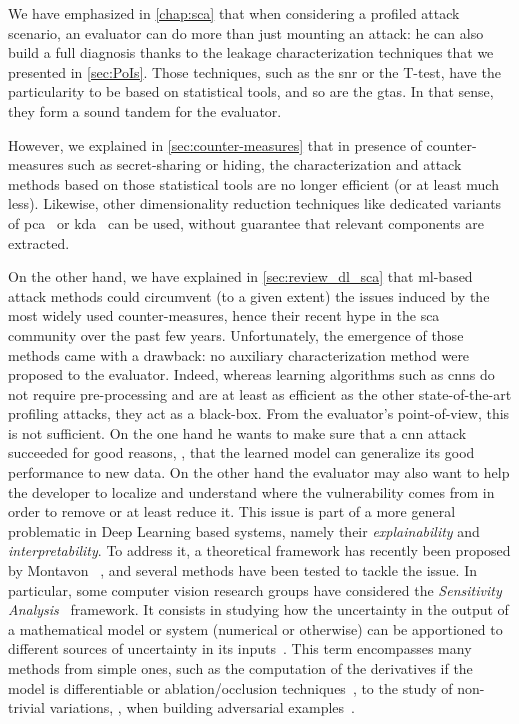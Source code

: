 We have emphasized in \autoref{chap:sca} that when considering a profiled attack scenario, an evaluator can do more than just mounting an attack: he can also build a full diagnosis thanks to the leakage characterization techniques that we presented in \autoref{sec:PoIs}.
Those techniques, such as the \gls{snr} or the T-test, have the particularity to be based on statistical tools, and so are the \glspl{gta}.
In that sense, they form a sound tandem for the evaluator.

However, we explained in \autoref{sec:counter-measures} that in presence of counter-measures such as secret-sharing or hiding, the characterization and attack methods based on those statistical tools are no longer efficient (or at least much less).
Likewise, other dimensionality reduction techniques like dedicated variants of \gls{pca}~\cite{cagli_enhancing_2016,standaert_using_2008,eisenbarth_building_2010,choudary_efficient_2014,choudary_efficient_2015} or \gls{kda}~\cite{cagli_kernel_2017} can be used, without guarantee that relevant components are extracted.

On the other hand, we have explained in \autoref{sec:review_dl_sca} that \gls{ml}-based attack methods could circumvent (to a given extent) the issues induced by the most widely used counter-measures, hence their recent hype in the \gls{sca} community over the past few years.
Unfortunately, the emergence of those methods came with a drawback: no auxiliary characterization method were proposed to the evaluator.
Indeed, whereas learning algorithms such as \glspl{cnn} do not require pre-processing and are at least as efficient as the other state-of-the-art profiling attacks, they act as a black-box.
From the evaluator's point-of-view, this is not sufficient. 
On the one hand he wants to make sure that a \gls{cnn} attack succeeded for good reasons,  \ie{}, that the learned model can generalize its good performance to new data. 
On the other hand the evaluator may also want to help the developer to localize and understand where the vulnerability comes from in order to remove or at least reduce it.
This issue is part of a more general problematic in Deep Learning based systems, namely their \emph{explainability} and \emph{interpretability}.
To address it, a theoretical framework has recently been proposed by Montavon \etal{}~\cite{montavon_methods_2018}, and several methods have been tested to tackle the issue. In particular, some computer vision research groups have considered the \emph{Sensitivity Analysis}~\cite{simonyan_deep_2013,springenberg_striving_2014} framework.
It consists in studying how the uncertainty in the output of a mathematical model or system (numerical or otherwise) can be apportioned to different sources of uncertainty 
in its inputs~\cite{sensitivity_wiki}.
This term encompasses many methods from simple ones, such as the computation of the derivatives if the model is differentiable or ablation/occlusion techniques~\cite{zeiler_visualizing_2013}, to the study of non-trivial variations, \eg{}, when building adversarial examples~\cite{szegedy_intriguing_2014,goodfellow_explaining_2015}.


